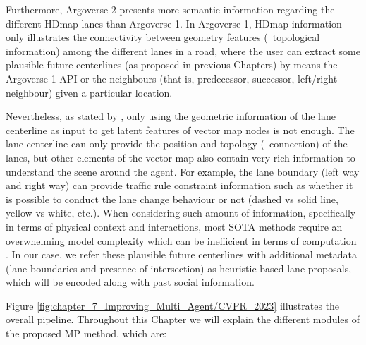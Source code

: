 Furthermore, Argoverse 2 presents more semantic information regarding the different \ac{HDmap} lanes than Argoverse 1. In Argoverse 1, \ac{HDmap} information only illustrates the connectivity between geometry features (\ie \ topological information) among the different lanes in a road, where the user can extract some plausible future centerlines (as proposed in previous Chapters) by means the Argoverse 1 \ac{API} or the neighbours (that is, predecessor, successor, left/right neighbour) given a particular location. 

Nevertheless, as stated by \cite{zhang2022banet}, only using the geometric information of the lane centerline as input to get latent features of vector map nodes is not enough. The lane centerline can only provide the position and topology (\ie \ connection) of the lanes, but other elements of the vector map also contain very rich information to understand the scene around the agent. For example, the lane boundary (left way and right way) can provide traffic rule constraint information such as whether it is possible to conduct the lane change behaviour or not (dashed vs solid line, yellow vs white, etc.). When considering such amount of information, specifically in terms of physical context and interactions, most \ac{SOTA} methods require an overwhelming model complexity which can be inefficient in terms of computation \cite{gao2020vectornet, walters2020trajectory, can2022maps}. In our case, we refer these plausible future centerlines with additional metadata (lane boundaries and presence of intersection) as heuristic-based lane proposals, which will be encoded along with past social information.

Figure \ref{fig:chapter_7_Improving_Multi_Agent/CVPR_2023} illustrates the overall pipeline. Throughout this Chapter we will explain the different modules of the proposed \ac{MP} method, which are:

